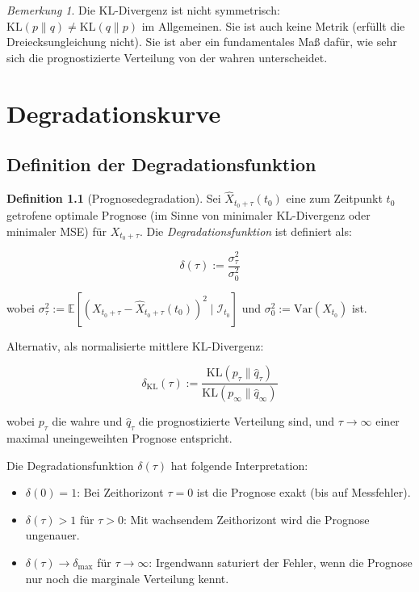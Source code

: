 \documentclass[12pt, a4paper, titlepage]{report}
\theoremstyle{definition}
\newtheorem{definition}[theorem]{Definition}
\theoremstyle{remark}
\newtheorem{remark}[theorem]{Bemerkung}
\newcommand{\E}{\mathbb{E}}
\newcommand{\Var}{\mathrm{Var}}
\newcommand{\KL}{\mathrm{KL}}
\begin{document}
\begin{remark}
Die KL-Divergenz ist nicht symmetrisch: $\KL(p \parallel q) \neq \KL(q \parallel p)$ im Allgemeinen. Sie ist auch keine Metrik (erfüllt die Dreiecksungleichung nicht). Sie ist aber ein fundamentales Maß dafür, wie sehr sich die prognostizierte Verteilung von der wahren unterscheidet.
\end{remark}

\chapter{Degradationskurve}
\label{sec:degradation}

\section{Definition der Degradationsfunktion}

\begin{definition}[Prognosedegradation]
Sei $\hat{X}_{t_0+\tau}(t_0)$ eine zum Zeitpunkt $t_0$ getrofene optimale Prognose (im Sinne von minimaler KL-Divergenz oder minimaler MSE) für $X_{t_0+\tau}$. Die \emph{Degradationsfunktion} ist definiert als:

\begin{equation}
\delta(\tau) := \frac{\sigma_\tau^2}{\sigma_0^2}
\label{eq:degradation}
\end{equation}

wobei $\sigma_\tau^2 := \E[(X_{t_0+\tau} - \hat{X}_{t_0+\tau}(t_0))^2 \mid \mathcal{I}_{t_0}]$ und $\sigma_0^2 := \Var(X_{t_0})$ ist.

Alternativ, als normalisierte mittlere KL-Divergenz:

\begin{equation}
\delta_{\KL}(\tau) := \frac{\KL(p_\tau \parallel \hat{q}_\tau)}{\KL(p_\infty \parallel \hat{q}_\infty)}
\label{eq:degradation_kl}
\end{equation}

wobei $p_\tau$ die wahre und $\hat{q}_\tau$ die prognostizierte Verteilung sind, und $\tau \to \infty$ einer maximal uneingeweihten Prognose entspricht.
\end{definition}

Die Degradationsfunktion $\delta(\tau)$ hat folgende Interpretation:
\begin{itemize}
  \item $\delta(0) = 1$: Bei Zeithorizont $\tau=0$ ist die Prognose exakt (bis auf Messfehler).
  \item $\delta(\tau) > 1$ für $\tau > 0$: Mit wachsendem Zeithorizont wird die Prognose ungenauer.
  \item $\delta(\tau) \to \delta_{\max}$ für $\tau \to \infty$: Irgendwann saturiert der Fehler, wenn die Prognose nur noch die marginale Verteilung kennt.
\end{itemize}
\end{document}
